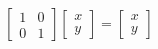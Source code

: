 \documentclass[preview]{standalone}
\begin{document}
\begin{align*}
\begin{bmatrix} 1 & 0 \\ 0 & 1 \end{bmatrix} \begin{bmatrix} x \\ y \end{bmatrix}  =  \begin{bmatrix} x \\ y \end{bmatrix}
\end{align*}
\end{document}
